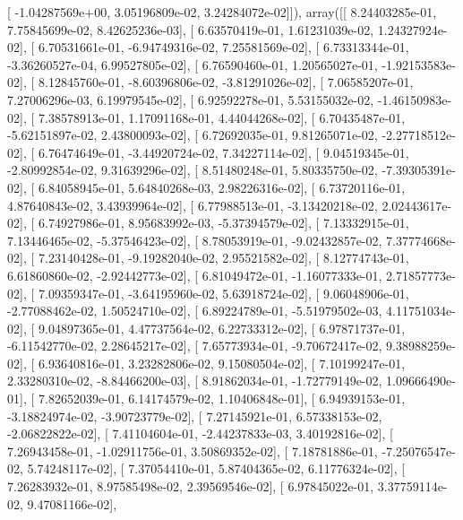 \documentclass{article}
\begin{document}
       [ -1.04287569e+00,   3.05196809e-02,   3.24284072e-02]]), array([[  8.24403285e-01,   7.75845699e-02,   8.42625236e-03],
       [  6.63570419e-01,   1.61231039e-02,   1.24327924e-02],
       [  6.70531661e-01,  -6.94749316e-02,   7.25581569e-02],
       [  6.73313344e-01,  -3.36260527e-04,   6.99527805e-02],
       [  6.76590460e-01,   1.20565027e-01,  -1.92153583e-02],
       [  8.12845760e-01,  -8.60396806e-02,  -3.81291026e-02],
       [  7.06585207e-01,   7.27006296e-03,   6.19979545e-02],
       [  6.92592278e-01,   5.53155032e-02,  -1.46150983e-02],
       [  7.38578913e-01,   1.17091168e-01,   4.44044268e-02],
       [  6.70435487e-01,  -5.62151897e-02,   2.43800093e-02],
       [  6.72692035e-01,   9.81265071e-02,  -2.27718512e-02],
       [  6.76474649e-01,  -3.44920724e-02,   7.34227114e-02],
       [  9.04519345e-01,  -2.80992854e-02,   9.31639296e-02],
       [  8.51480248e-01,   5.80335750e-02,  -7.39305391e-02],
       [  6.84058945e-01,   5.64840268e-03,   2.98226316e-02],
       [  6.73720116e-01,   4.87640843e-02,   3.43939964e-02],
       [  6.77988513e-01,  -3.13420218e-02,   2.02443617e-02],
       [  6.74927986e-01,   8.95683992e-03,  -5.37394579e-02],
       [  7.13332915e-01,   7.13446465e-02,  -5.37546423e-02],
       [  8.78053919e-01,  -9.02432857e-02,   7.37774668e-02],
       [  7.23140428e-01,  -9.19282040e-02,   2.95521582e-02],
       [  8.12774743e-01,   6.61860860e-02,  -2.92442773e-02],
       [  6.81049472e-01,  -1.16077333e-01,   2.71857773e-02],
       [  7.09359347e-01,  -3.64195960e-02,   5.63918724e-02],
       [  9.06048906e-01,  -2.77088462e-02,   1.50524710e-02],
       [  6.89224789e-01,  -5.51979502e-03,   4.11751034e-02],
       [  9.04897365e-01,   4.47737564e-02,   6.22733312e-02],
       [  6.97871737e-01,  -6.11542770e-02,   2.28645217e-02],
       [  7.65773934e-01,  -9.70672417e-02,   9.38988259e-02],
       [  6.93640816e-01,   3.23282806e-02,   9.15080504e-02],
       [  7.10199247e-01,   2.33280310e-02,  -8.84466200e-03],
       [  8.91862034e-01,  -1.72779149e-02,   1.09666490e-01],
       [  7.82652039e-01,   6.14174579e-02,   1.10406848e-01],
       [  6.94939153e-01,  -3.18824974e-02,  -3.90723779e-02],
       [  7.27145921e-01,   6.57338153e-02,  -2.06822822e-02],
       [  7.41104604e-01,  -2.44237833e-03,   3.40192816e-02],
       [  7.26943458e-01,  -1.02911756e-01,   3.50869352e-02],
       [  7.18781886e-01,  -7.25076547e-02,   5.74248117e-02],
       [  7.37054410e-01,   5.87404365e-02,   6.11776324e-02],
       [  7.26283932e-01,   8.97585498e-02,   2.39569546e-02],
       [  6.97845022e-01,   3.37759114e-02,   9.47081166e-02],
\end{document}
